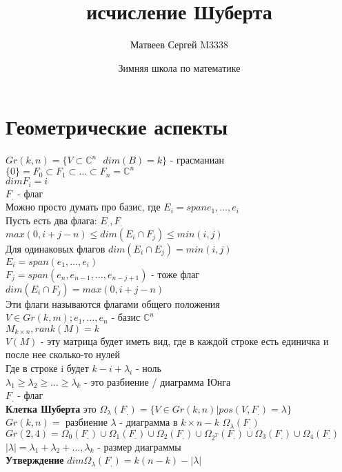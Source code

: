 \documentclass{article}
\title{\hugeКомбинаторное исчисление Шуберта}
\author{Матвеев Сергей M3338}
\date{Зимняя школа по математике}
\newcommand\0{\mathbb{0}}
\newcommand\1{\mathbb{1}}
\renewcommand{\bf}{\textbf}
\begin{document}
\maketitle
\section{Геометрические аспекты}
$Gr(k, n) = \{V \subset \mathbb{C}^n\text{ }dim(B) = k\}$ - грасманиан\\
$\{0\} = F_0 \subset F_1 \subset \dots \subset F_n = \mathbb{C}^n$\\
$dim F_i = i$\\
$F_.$ - флаг\\
Можно просто думать про базис, где $E_i = span{e_1, \dots, e_i}$\\
Пусть есть два флага: $E_., F_.$\\
$max(0, i + j - n) \leq dim(E_i \cap F_j) \leq min(i, j)$\\
Для одинаковых флагов $dim(E_i \cap E_j) = min(i, j)$\\
$E_i = span(e_1, \dots, e_i)$\\
$F_j = span(e_n, e_{n - 1}, \dots, e_{n - j + 1})$ - тоже флаг\\
$dim(E_i \cap F_j) = max(0, i + j - n)$\\
Эти флаги называются флагами общего положения\\
$V \in Gr(k, m); e_1, \dots, e_n$ - базис $\mathbb{C}^n$\\
$M_{k \times n}, rank(M) = k$\\
$V(M)$ - эту матрица будет иметь вид, где в каждой строке есть единичка и после нее сколько-то нулей\\
Где в строке i будет $k - i + \lambda_i$ - ноль\\
$\lambda_1 \geq \lambda_2 \geq \dots \geq \lambda_k$ - это разбиение / диаграмма Юнга\\
$F_.$ - флаг\\
\bf{Клетка Шуберта} это $\Omega_\lambda(F_.) = \{V \in Gr(k, n) | pos(V, F_.) = \lambda \}$\\
$Gr(k, n) = $ разбиение $\lambda$ - диаграмма в $k \times n - k$ $\Omega_\lambda(F_.)$\\
$Gr(2, 4) = \Omega_0(F_.) \cup \Omega_1(F_.) \cup \Omega_2(F_.) \cup \Omega_{2^T}(F_.) \cup \Omega_3(F_.) \cup \Omega_4(F_.)$\\
$|\lambda| = \lambda_1 + \lambda_2 + \dots, \lambda_k$ - размер диаграммы\\
\bf{Утверждение} $dim\Omega_\lambda(F_.) = k(n - k) - |\lambda|$\\
\end{document}
